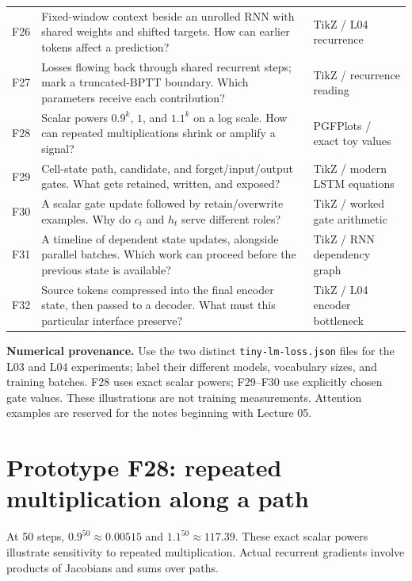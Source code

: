 \documentclass[11pt,a4paper]{article}
\begin{document}
\begin{tabularx}{\textwidth}{@{}p{8mm} Y >{\raggedright\arraybackslash}p{32mm}@{}}
F26 & Fixed-window context beside an unrolled RNN with shared weights and shifted targets. How can earlier tokens affect a prediction? & TikZ / L04 recurrence\\
F27 & Losses flowing back through shared recurrent steps; mark a truncated-BPTT boundary. Which parameters receive each contribution? & TikZ / recurrence reading\\
F28 & Scalar powers $0.9^k$, $1$, and $1.1^k$ on a log scale. How can repeated multiplications shrink or amplify a signal? & PGFPlots / exact toy values\\
F29 & Cell-state path, candidate, and forget/input/output gates. What gets retained, written, and exposed? & TikZ / modern LSTM equations\\
F30 & A scalar gate update followed by retain/overwrite examples. Why do $c_t$ and $h_t$ serve different roles? & TikZ / worked gate arithmetic\\
F31 & A timeline of dependent state updates, alongside parallel batches. Which work can proceed before the previous state is available? & TikZ / RNN dependency graph\\
F32 & Source tokens compressed into the final encoder state, then passed to a decoder. What must this particular interface preserve? & TikZ / L04 encoder bottleneck\\
\bottomrule
\end{tabularx}
\endgroup

\textbf{Numerical provenance.} Use the two distinct
\texttt{tiny-lm-loss.json} files for the L03 and L04 experiments; label
their different models, vocabulary sizes, and training batches.
F28 uses exact scalar powers; F29--F30 use explicitly chosen gate values.
These illustrations are not training measurements. Attention examples are
reserved for the notes beginning with Lecture 05.

\clearpage
\section{Prototype F28: repeated multiplication along a path}
At 50 steps, $0.9^{50}\approx0.00515$ and $1.1^{50}\approx117.39$.
These exact scalar powers illustrate sensitivity to repeated multiplication.
Actual recurrent gradients involve products of Jacobians and sums over paths.

\begin{center}

\end{center}
\end{document}
